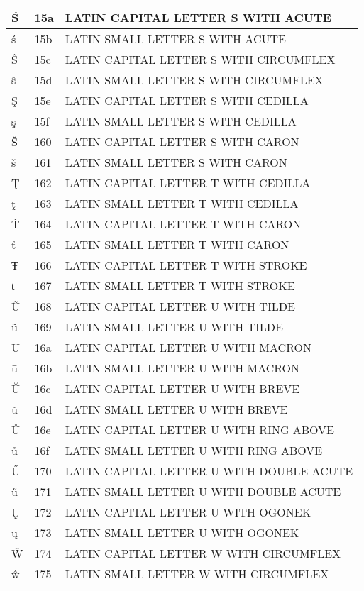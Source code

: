 \documentclass[12pt,letterpaper,openany]{book}
\begin{document}
\begin{center}
\begin{supertabular}{|m{0.25in}|m{0.5in}|m{4in}|}
Ś & 15a & LATIN CAPITAL LETTER S WITH ACUTE\\\hline
ś & 15b & LATIN SMALL LETTER S WITH ACUTE\\\hline
Ŝ & 15c & LATIN CAPITAL LETTER S WITH CIRCUMFLEX\\\hline
ŝ & 15d & LATIN SMALL LETTER S WITH CIRCUMFLEX\\\hline
Ş & 15e & LATIN CAPITAL LETTER S WITH CEDILLA\\\hline
ş & 15f & LATIN SMALL LETTER S WITH CEDILLA\\\hline
Š & 160 & LATIN CAPITAL LETTER S WITH CARON\\\hline
š & 161 & LATIN SMALL LETTER S WITH CARON\\\hline
Ţ & 162 & LATIN CAPITAL LETTER T WITH CEDILLA\\\hline
ţ & 163 & LATIN SMALL LETTER T WITH CEDILLA\\\hline
Ť & 164 & LATIN CAPITAL LETTER T WITH CARON\\\hline
ť & 165 & LATIN SMALL LETTER T WITH CARON\\\hline
Ŧ & 166 & LATIN CAPITAL LETTER T WITH STROKE\\\hline
ŧ & 167 & LATIN SMALL LETTER T WITH STROKE\\\hline
Ũ & 168 & LATIN CAPITAL LETTER U WITH TILDE\\\hline
ũ & 169 & LATIN SMALL LETTER U WITH TILDE\\\hline
Ū & 16a & LATIN CAPITAL LETTER U WITH MACRON\\\hline
ū & 16b & LATIN SMALL LETTER U WITH MACRON\\\hline
Ŭ & 16c & LATIN CAPITAL LETTER U WITH BREVE\\\hline
ŭ & 16d & LATIN SMALL LETTER U WITH BREVE\\\hline
Ů & 16e & LATIN CAPITAL LETTER U WITH RING ABOVE\\\hline
ů & 16f & LATIN SMALL LETTER U WITH RING ABOVE\\\hline
Ű & 170 & LATIN CAPITAL LETTER U WITH DOUBLE ACUTE\\\hline
ű & 171 & LATIN SMALL LETTER U WITH DOUBLE ACUTE\\\hline
Ų & 172 & LATIN CAPITAL LETTER U WITH OGONEK\\\hline
ų & 173 & LATIN SMALL LETTER U WITH OGONEK\\\hline
Ŵ & 174 & LATIN CAPITAL LETTER W WITH CIRCUMFLEX\\\hline
ŵ & 175 & LATIN SMALL LETTER W WITH CIRCUMFLEX\\\hline

\end{supertabular}
\end{center}
\end{document}
